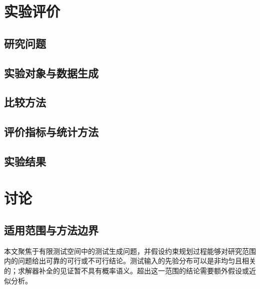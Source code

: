 \documentclass[UTF8, fontset=none, a4paper, 12pt]{ctexart}
\begin{document}
\section{实验评价}

\subsection{研究问题}


\subsection{实验对象与数据生成}


\subsection{比较方法}


\subsection{评价指标与统计方法}


\subsection{实验结果}


\section{讨论}

\subsection{适用范围与方法边界}

本文聚焦于有限测试空间中的测试生成问题，并假设约束规划过程能够对研究范围内的问题给出可靠的可行或不可行结论。测试输入的先验分布可以是非均匀且相关的；求解器补全的见证暂不具有概率语义。超出这一范围的结论需要额外假设或近似分析。
\end{document}

